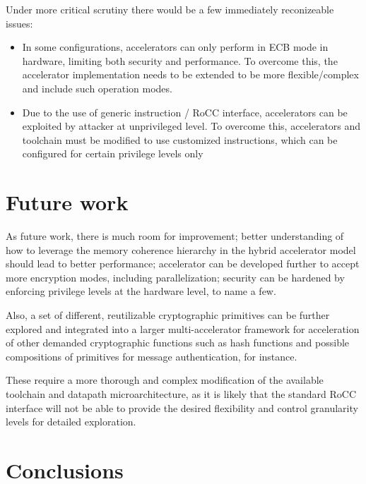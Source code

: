 \documentclass[10pt,conference]{IEEEtran}
\begin{document}
Under more critical scrutiny there would be a few immediately reconizeable
issues:

\begin{itemize}
  \item In some configurations, accelerators can only perform in ECB mode in
    hardware, limiting both security and performance. To overcome this, the
    accelerator implementation needs to be extended to be more flexible/complex
    and include such operation modes.
  \item Due to the use of generic instruction / RoCC interface, accelerators
    can be exploited by attacker at unprivileged level. To overcome this,
    accelerators and toolchain must be modified to use customized instructions,
    which can be configured for certain privilege levels only
\end{itemize}

\section{Future work}

As future work, there is much room for improvement; better understanding of how
to leverage the memory coherence hierarchy in the hybrid accelerator model
should lead to better performance; accelerator can be developed further to
accept more encryption modes, including parallelization; security can be
hardened by enforcing privilege levels at the hardware level, to name a few.

Also, a set of different, reutilizable cryptographic primitives can be further
explored and integrated into a larger multi-accelerator framework for
acceleration of other demanded cryptographic functions such as hash functions
and possible compositions of primitives for message authentication, for instance.

These require a more thorough and complex modification of the available
toolchain and datapath microarchitecture, as it is likely that the standard RoCC
interface will not be able to provide the desired flexibility and control
granularity levels for detailed exploration.

\section{Conclusions}



\end{document}
